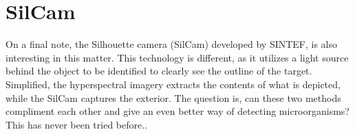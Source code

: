 \section{SilCam}
On a final note, the Silhouette camera (SilCam) developed by SINTEF, is also interesting in this matter. This technology is different, as it utilizes a light source behind the object to be identified to clearly see the outline of the target. Simplified, the hyperspectral imagery extracts the contents of what is depicted, while the SilCam captures the exterior. The question is, can these two methods compliment each other and give an even better way of detecting microorganisms? This has never been tried before..

